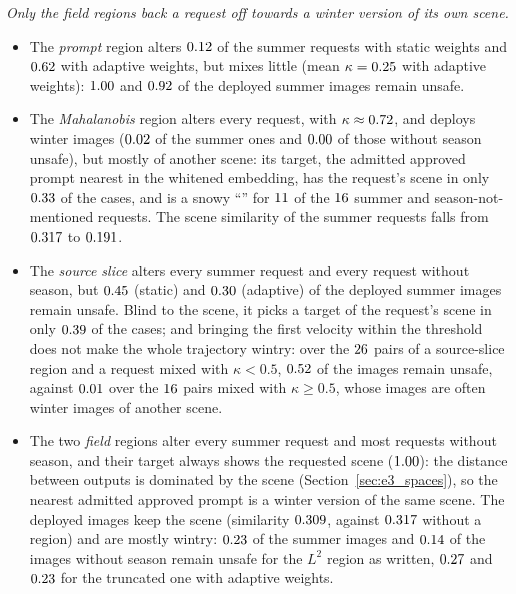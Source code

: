 \documentclass{article}
\theoremstyle{plain}
\theoremstyle{remark}
\begin{document}
\emph{Only the field regions back a request off towards a winter version of its own scene.}
\begin{itemize}
\item The \emph{prompt} region alters $0.12$ of the summer requests with static weights and $0.62$ with adaptive
weights, but mixes little (mean $\kappa=0.25$ with adaptive weights): $1.00$ and $0.92$ of the deployed
summer images remain unsafe.
\item The \emph{Mahalanobis} region alters every request, with $\kappa\approx0.72$, and deploys winter images
($0.02$ of the summer ones and $0.00$ of those without season unsafe), but mostly of another scene: its target,
the admitted approved prompt nearest in the whitened embedding, has the request's scene in only $0.33$ of the cases, and is
a snowy ``\ethHubSceneMH'' for $11$ of the $16$ summer and season-not-mentioned requests. The scene similarity of the
summer requests falls from $0.317$ to $0.191$.
\item The \emph{source slice} alters every summer request and every request without season, but $0.45$ (static) and
$0.30$ (adaptive) of the deployed summer images remain unsafe. Blind to the scene, it picks a target of the request's
scene in only $0.39$ of the cases; and bringing the first velocity within the threshold does not make the whole trajectory
wintry: over the $26$ pairs of a source-slice region and a request mixed with $\kappa<0.5$, $0.52$ of the
images remain unsafe, against $0.01$ over the $16$ pairs mixed with $\kappa\ge0.5$, whose images are often
winter images of another scene.
\item The two \emph{field} regions alter every summer request and most requests without season, and their target always shows the
requested scene ($1.00$): the distance between outputs is dominated by the scene (Section~\ref{sec:e3_spaces}), so the
nearest admitted approved prompt is a winter version of the same scene. The deployed images keep the scene (similarity
$0.309$, against $0.317$ without a region) and are mostly wintry: $0.23$ of the summer images and
$0.14$ of the images without season remain unsafe for the $L^2$ region as written, $0.27$ and
$0.23$ for the truncated one with adaptive weights.
\end{itemize}
\end{document}
